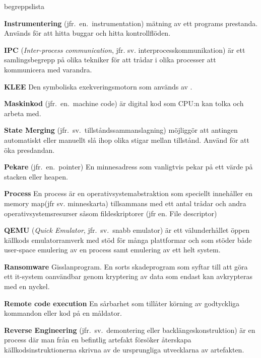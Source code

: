 \begin{labeling}{begreppslista}
    \item [\textbf{Instrumentering}] (jfr.\ en.\ instrumentation)
    mätning av ett programs prestanda. Används för att hitta
    buggar och hitta kontrollflöden.

    \item [\textbf{IPC}] (\emph{Inter-process communication}, jfr. sv.
          interprocesskommunikation) är ett samlingsbegrepp på olika
    tekniker för att trådar i olika processer att kommunicera med
    varandra.

    \item [\textbf{KLEE}] Den symboliska exekveringsmotorn som används
    av \stoe{}.

    \item [\textbf{Maskinkod}] (jfr.\ en.\ machine code) är digital
    kod som CPU:n kan tolka och arbeta med.

    \item [\textbf{State Merging}]
          (jfr.\ sv.\ tillståndssammanslagning) möjliggör att antingen
    automatiskt eller manuellt slå ihop olika stigar mellan
    tillstånd.  Använd för att öka presdandan.

    \item [\textbf{Pekare}] (jfr.\ en.\ pointer) En minnesadress som
    vanligtvis pekar på ett värde på stacken eller heapen.

    \item [\textbf{Process}] En process är en
    operativsystemabstraktion som speciellt innehåller en memory
    map(jfr sv. minneskarta) tillsammans med ett antal trådar och
    andra operativsystemsresurser såsom fildeskriptorer (jfr
    en. File descriptor)

    \item [\textbf{QEMU}] (\emph{Quick Emulator}, jfr.\ sv.\ snabb
          emulator) är ett välunderhållet öppen källkods emulatorramverk
    med stöd för många plattformar och som stöder både user-space
    emulering av en process samt emulering av ett helt system.

    \item [\textbf{Ransomware}] Gisslanprogram. En sorts skadeprogram
    som syftar till att göra ett it-system oanvändbar genom
    kryptering av data som endast kan avkrypteras med en nyckel.

    \item [\textbf{Remote code execution}] En sårbarhet som tillåter
    körning av godtyckliga kommandon eller kod på en måldator.

    \item [\textbf{Reverse Engineering}] (jfr.\ sv.\ demontering eller
          backlängeskonstruktion) är en process där man från en
    befintlig artefakt försöker återskapa källkodsinstruktionerna
    skrivna av de ursprungliga utvecklarna av artefakten.


\end{labeling}
